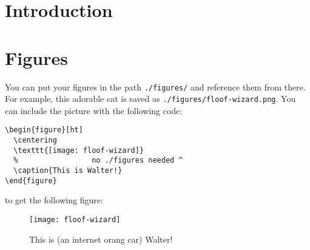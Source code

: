 \chapter{Introduction} \label{chap:intro}

\lipsum[1-2]

\chapter{Figures} \label{chap:figs}

You can put your figures in the path \texttt{./figures/} and reference them from
there. For example, this adorable cat is saved as \texttt{./figures/floof-wizard.png}. You can include the picture with the following code:
\begin{verbatim}
\begin{figure}[ht]
  \centering
  \texttt{[image: floof-wizard]}
  %                 no ./figures needed ^
  \caption{This is Walter!}
\end{figure}
\end{verbatim}
to get the following figure:
\begin{figure}[ht]
  \centering
  \texttt{[image: floof-wizard]}
  \caption{This is (an internet orang car) Walter!}
\end{figure}
